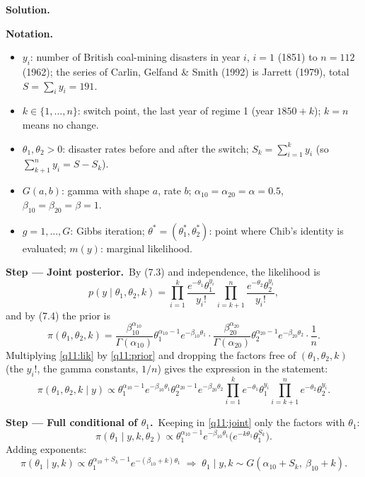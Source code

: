 \documentclass[11pt,a4paper]{article}
\numberwithin{equation}{questao}   %
\newenvironment{notacao}{\par\smallskip\noindent\textbf{Notation.}\begin{itemize}[leftmargin=1.4em,topsep=1pt,itemsep=0pt]\small}{\end{itemize}}
\newcommand{\passo}[2]{\par\smallskip\noindent\textbf{Step --- #1.}~#2}
\newcommand{\solhead}{\par\medskip\noindent{\color{blue!55!black}\rule{\linewidth}{0.3pt}}\par\noindent\textbf{Solution.}}
\newcommand{\1}{\mathbf{1}}
\begin{document}
\begin{sol}
\solhead
\begin{notacao}
\item $y_i$: number of British coal-mining disasters in year $i$, $i=1$ (1851) to $n=112$ (1962);
  the series of Carlin, Gelfand \& Smith (1992) is Jarrett (1979), total $S=\sum_iy_i=191$.
\item $k\in\{1,\dots,n\}$: switch point, the last year of regime 1 (year $1850+k$); $k=n$ means no change.
\item $\theta_1,\theta_2>0$: disaster rates before and after the switch;
  $S_k=\sum_{i=1}^ky_i$ (so $\sum_{k+1}^ny_i=S-S_k$).
\item $G(a,b)$: gamma with shape $a$, rate $b$; $\alpha_{10}=\alpha_{20}=\alpha=0.5$,
  $\beta_{10}=\beta_{20}=\beta=1$.
\item $g=1,\dots,G$: Gibbs iteration; $\theta^*=(\theta_1^*,\theta_2^*)$: point where Chib's
  identity is evaluated; $m(y)$: marginal likelihood.
\end{notacao}

\passo{Joint posterior}{By (7.3) and independence, the likelihood is}
\begin{equation}\label{q11:lik}
p(y\mid\theta_1,\theta_2,k)=\prod_{i=1}^k\frac{e^{-\theta_1}\theta_1^{y_i}}{y_i!}
\prod_{i=k+1}^n\frac{e^{-\theta_2}\theta_2^{y_i}}{y_i!},
\end{equation}
and by (7.4) the prior is
\begin{equation}\label{q11:prior}
\pi(\theta_1,\theta_2,k)=\frac{\beta_{10}^{\alpha_{10}}}{\Gamma(\alpha_{10})}\theta_1^{\alpha_{10}-1}e^{-\beta_{10}\theta_1}
\cdot\frac{\beta_{20}^{\alpha_{20}}}{\Gamma(\alpha_{20})}\theta_2^{\alpha_{20}-1}e^{-\beta_{20}\theta_2}\cdot\frac1n .
\end{equation}
Multiplying \eqref{q11:lik} by \eqref{q11:prior} and dropping the factors free of
$(\theta_1,\theta_2,k)$ (the $y_i!$, the gamma constants, $1/n$) gives the expression in the statement:
\begin{equation}\label{q11:joint}
\pi(\theta_1,\theta_2,k\mid y)\propto\theta_1^{\alpha_{10}-1}e^{-\beta_{10}\theta_1}\theta_2^{\alpha_{20}-1}e^{-\beta_{20}\theta_2}
\prod_{i=1}^{k}e^{-\theta_1}\theta_1^{y_i}\prod_{i=k+1}^{n}e^{-\theta_2}\theta_2^{y_i}.
\end{equation}

\passo{Full conditional of $\theta_1$}{Keeping in \eqref{q11:joint} only the factors with $\theta_1$:}
\[
\pi(\theta_1\mid y,k,\theta_2)\propto\theta_1^{\alpha_{10}-1}e^{-\beta_{10}\theta_1}\big(e^{-k\theta_1}\theta_1^{S_k}\big).
\]
Adding exponents:
\begin{equation}\label{q11:t1}
\pi(\theta_1\mid y,k)\propto\theta_1^{\alpha_{10}+S_k-1}e^{-(\beta_{10}+k)\theta_1}
\;\Longrightarrow\;\theta_1\mid y,k\sim G(\alpha_{10}+S_k,\ \beta_{10}+k).
\end{equation}


\end{sol}
\end{document}
